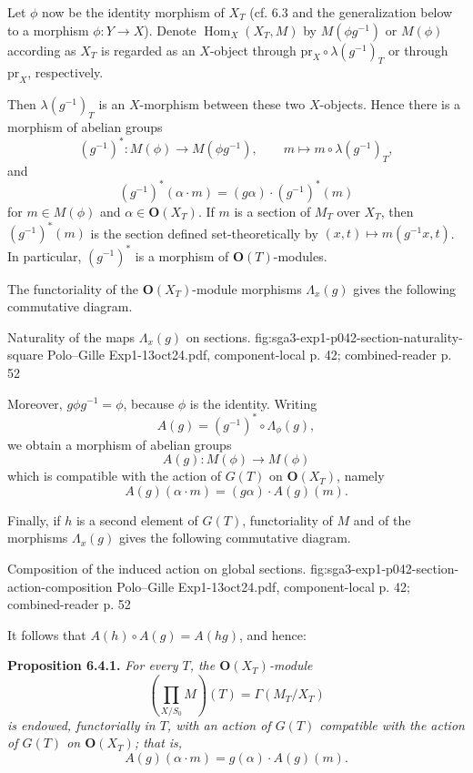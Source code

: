 Let \(\phi\) now be the identity morphism of \(X_T\) (cf. 6.3 and the
generalization below to a morphism \(\phi:Y\to X\)). Denote
\(\operatorname{Hom}_X(X_T,M)\) by \(M(\phi g^{-1})\) or \(M(\phi)\)
according as \(X_T\) is regarded as an \(X\)-object through
\(\mathrm{pr}_X\circ\lambda(g^{-1})_T\) or through
\(\mathrm{pr}_X\), respectively.

Then \(\lambda(g^{-1})_T\) is an \(X\)-morphism between these two
\(X\)-objects. Hence there is a morphism of abelian groups
\[
  (g^{-1})^*:M(\phi)\longrightarrow M(\phi g^{-1}),
  \qquad
  m\longmapsto m\circ\lambda(g^{-1})_T,
\]
and
\[
  (g^{-1})^*(\alpha\cdot m)
  =(g\alpha)\cdot(g^{-1})^*(m)
\]
for \(m\in M(\phi)\) and \(\alpha\in\mathbf O(X_T)\). If \(m\) is a
section of \(M_T\) over \(X_T\), then \((g^{-1})^*(m)\) is the section
defined set-theoretically by
\((x,t)\mapsto m(g^{-1}x,t)\). In particular, \((g^{-1})^*\) is a
morphism of \(\mathbf O(T)\)-modules.

The functoriality of the \(\mathbf O(X_T)\)-module morphisms
\(\Lambda_x(g)\) gives the following commutative diagram.

  {Naturality of the maps \(\Lambda_x(g)\) on sections.}
  {fig:sga3-exp1-p042-section-naturality-square}
  {Polo--Gille Exp1-13oct24.pdf, component-local p. 42; combined-reader p. 52}

Moreover, \(g\phi g^{-1}=\phi\), because \(\phi\) is the identity.
Writing
\[
  A(g)=(g^{-1})^*\circ\Lambda_\phi(g),
\]
we obtain a morphism of abelian groups
\[
  A(g):M(\phi)\longrightarrow M(\phi)
\]
which is compatible with the action of \(G(T)\) on
\(\mathbf O(X_T)\), namely
\[
  A(g)(\alpha\cdot m)=(g\alpha)\cdot A(g)(m).
\]

Finally, if \(h\) is a second element of \(G(T)\), functoriality of
\(M\) and of the morphisms \(\Lambda_x(g)\) gives the following
commutative diagram.

  {Composition of the induced action on global sections.}
  {fig:sga3-exp1-p042-section-action-composition}
  {Polo--Gille Exp1-13oct24.pdf, component-local p. 42; combined-reader p. 52}

It follows that \(A(h)\circ A(g)=A(hg)\), and hence:

\medskip
\noindent\textbf{Proposition 6.4.1.}
\textit{For every \(T\), the \(\mathbf O(X_T)\)-module
\[
  \left(\prod_{X/S_0}M\right)(T)=\Gamma(M_T/X_T)
\]
is endowed, functorially in \(T\), with an action of \(G(T)\) compatible
with the action of \(G(T)\) on \(\mathbf O(X_T)\); that is,}
\[
  A(g)(\alpha\cdot m)=g(\alpha)\cdot A(g)(m).
\]

